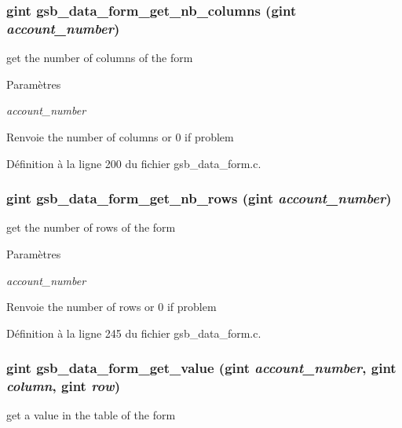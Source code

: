 \subsubsection[{gsb\_\-data\_\-form\_\-get\_\-nb\_\-columns}]{\setlength{\rightskip}{0pt plus 5cm}gint gsb\_\-data\_\-form\_\-get\_\-nb\_\-columns (gint {\em account\_\-number})}\label{gsb__data__form_8c_a4bc1dd95bb028e836ef638b937e28116}
get the number of columns of the form


\begin{DoxyParams}{Paramètres}
\item[{\em account\_\-number}]\end{DoxyParams}
\begin{DoxyReturn}{Renvoie}
the number of columns or 0 if problem 
\end{DoxyReturn}


Définition à la ligne 200 du fichier gsb\_\-data\_\-form.c.

\subsubsection[{gsb\_\-data\_\-form\_\-get\_\-nb\_\-rows}]{\setlength{\rightskip}{0pt plus 5cm}gint gsb\_\-data\_\-form\_\-get\_\-nb\_\-rows (gint {\em account\_\-number})}\label{gsb__data__form_8c_af5613a656e573f2e9a95d1c89c495c1c}
get the number of rows of the form


\begin{DoxyParams}{Paramètres}
\item[{\em account\_\-number}]\end{DoxyParams}
\begin{DoxyReturn}{Renvoie}
the number of rows or 0 if problem 
\end{DoxyReturn}


Définition à la ligne 245 du fichier gsb\_\-data\_\-form.c.

\subsubsection[{gsb\_\-data\_\-form\_\-get\_\-value}]{\setlength{\rightskip}{0pt plus 5cm}gint gsb\_\-data\_\-form\_\-get\_\-value (gint {\em account\_\-number}, \/  gint {\em column}, \/  gint {\em row})}\label{gsb__data__form_8c_a1f2dc075c964a00b50da003f969bb517}
get a value in the table of the form


